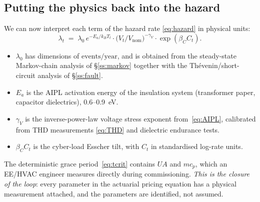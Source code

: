 \subsection{Putting the physics back into the hazard}\label{ss:closure}

We can now interpret each term of the hazard rate
\eqref{eq:hazard} in physical units:
\begin{equation*}
   \lambda_t \;=\; \lambda_0\, e^{-E_a/k_B T_t}
              \cdot \bigl(V_t/V_{\mathrm{nom}}\bigr)^{-\gamma_V}
              \cdot \exp(\beta_C C_t).
\end{equation*}
\begin{itemize}[leftmargin=*,nosep]
  \item $\lambda_0$ has dimensions of $\mathrm{events}/\mathrm{year}$,
        and is obtained from the steady-state Markov-chain analysis
        of \S\ref{ss:markov} together with the Th\'evenin/short-circuit
        analysis of \S\ref{ss:fault}.
  \item $E_a$ is the AIPL activation energy of the insulation system
        (transformer paper, capacitor dielectrics), \SI{0.6}{}--\SI{0.9}{\electronvolt}.
  \item $\gamma_V$ is the inverse-power-law voltage stress exponent
        from~\eqref{eq:AIPL}, calibrated from THD measurements
        \eqref{eq:THD} and dielectric endurance tests.
  \item $\beta_C C_t$ is the cyber-load Esscher tilt, with $C_t$
        in standardised log-rate units.
\end{itemize}
The deterministic grace period~\eqref{eq:tcrit} contains $UA$ and
$mc_p$, which an EE/HVAC engineer measures directly during
commissioning. \emph{This is the closure of the loop}: every parameter
in the actuarial pricing equation has a physical measurement
attached, and the parameters are identified, not assumed.

